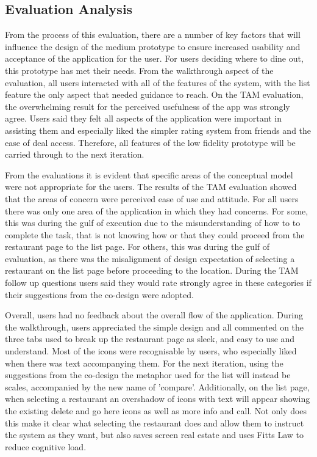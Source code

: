 \documentclass[a4 paper, 12pt]{article}
\begin{document}
\subsection{Evaluation Analysis}
From the process of this evaluation, there are a number of key factors that will influence the design of the medium prototype to ensure increased usability and acceptance of the application for the user. For users deciding where to dine out, this prototype has met their needs. From the walkthrough aspect of the evaluation, all users interacted with all of the features of the system, with the list feature the only aspect that needed guidance to reach. On the TAM evaluation, the overwhelming result for the perceived usefulness of the app was strongly agree. Users said they felt all aspects of the application were important in assisting them and especially liked the simpler rating system from friends and the ease of deal access. Therefore, all features of the low fidelity prototype will be carried through to the next iteration.

From the evaluations it is evident that specific areas of the conceptual model were not appropriate for the users. The results of the TAM evaluation showed that the areas of concern were perceived ease of use and attitude. For all users there was only one area of the application in which they had concerns. For some, this was during the gulf of execution due to the misunderstanding of how to to complete the task, that is not knowing how or that they could proceed from the restaurant page to the list page. For others, this was during the gulf of evaluation, as there was the misalignment of design expectation of selecting a restaurant on the list page before proceeding to the location. During the TAM follow up questions users said they would rate strongly agree in these categories if their suggestions from the co-design were adopted. 

Overall, users had no feedback about the overall flow of the application. During the walkthrough, users appreciated the simple design and all commented on the three tabs used to break up the restaurant page as sleek, and easy to use and understand. Most of the icons were recognisable by users, who especially liked when there was text accompanying them. For the next iteration, using the suggestions from the co-design the metaphor used for the list will instead be scales, accompanied by the new name of 'compare'. Additionally, on the list page, when selecting a restaurant an overshadow of icons with text will appear showing the existing delete and go here icons as well as more info and call. Not only does this make it clear what selecting the restaurant does and allow them to instruct the system as they want, but also saves screen real estate and uses Fitts Law to reduce cognitive load.  
\end{document}
